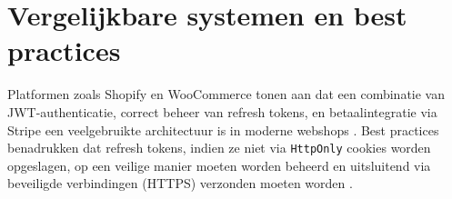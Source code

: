 


\section{Vergelijkbare systemen en best practices}

Platformen zoals Shopify en WooCommerce tonen aan dat een combinatie van JWT-authenticatie, correct beheer van refresh tokens, en betaalintegratie via Stripe een veelgebruikte architectuur is in moderne webshops \autocite{BaeldungJWT,StripeDocs2024}. Best practices benadrukken dat refresh tokens, indien ze niet via \texttt{HttpOnly} cookies worden opgeslagen, op een veilige manier moeten worden beheerd en uitsluitend via beveiligde verbindingen (HTTPS) verzonden moeten worden \autocite{OWASP2021}.